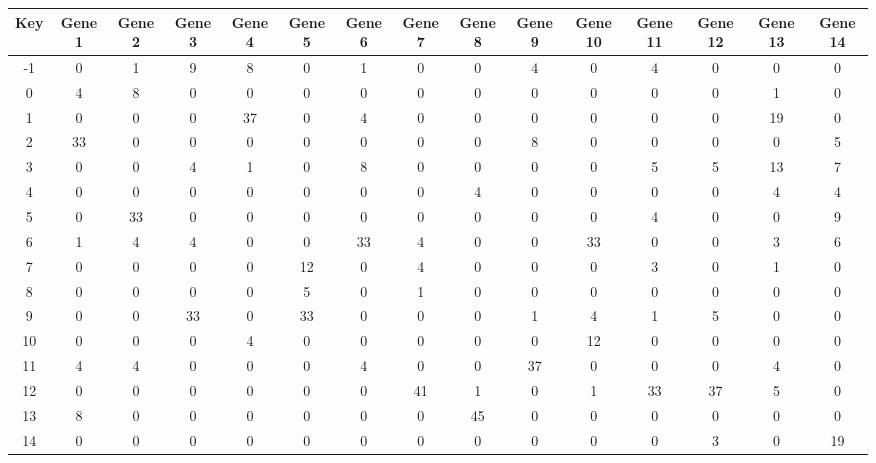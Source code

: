 \begin{tabular}{|c|c|c|c|c|c|c|c|c|c|c|c|c|c|c|}
\hline
Key & Gene 1 & Gene 2 & Gene 3 & Gene 4 & Gene 5 & Gene 6 & Gene 7 & Gene 8 & Gene 9 & Gene 10 & Gene 11 & Gene 12 & Gene 13 & Gene 14 \\
\hline
-1 & 0 & 1 & 9 & 8 & 0 & 1 & 0 & 0 & 4 & 0 & 4 & 0 & 0 & 0 \\
0 & 4 & 8 & 0 & 0 & 0 & 0 & 0 & 0 & 0 & 0 & 0 & 0 & 1 & 0 \\
1 & 0 & 0 & 0 & 37 & 0 & 4 & 0 & 0 & 0 & 0 & 0 & 0 & 19 & 0 \\
2 & 33 & 0 & 0 & 0 & 0 & 0 & 0 & 0 & 8 & 0 & 0 & 0 & 0 & 5 \\
3 & 0 & 0 & 4 & 1 & 0 & 8 & 0 & 0 & 0 & 0 & 5 & 5 & 13 & 7 \\
4 & 0 & 0 & 0 & 0 & 0 & 0 & 0 & 4 & 0 & 0 & 0 & 0 & 4 & 4 \\
5 & 0 & 33 & 0 & 0 & 0 & 0 & 0 & 0 & 0 & 0 & 4 & 0 & 0 & 9 \\
6 & 1 & 4 & 4 & 0 & 0 & 33 & 4 & 0 & 0 & 33 & 0 & 0 & 3 & 6 \\
7 & 0 & 0 & 0 & 0 & 12 & 0 & 4 & 0 & 0 & 0 & 3 & 0 & 1 & 0 \\
8 & 0 & 0 & 0 & 0 & 5 & 0 & 1 & 0 & 0 & 0 & 0 & 0 & 0 & 0 \\
9 & 0 & 0 & 33 & 0 & 33 & 0 & 0 & 0 & 1 & 4 & 1 & 5 & 0 & 0 \\
10 & 0 & 0 & 0 & 4 & 0 & 0 & 0 & 0 & 0 & 12 & 0 & 0 & 0 & 0 \\
11 & 4 & 4 & 0 & 0 & 0 & 4 & 0 & 0 & 37 & 0 & 0 & 0 & 4 & 0 \\
12 & 0 & 0 & 0 & 0 & 0 & 0 & 41 & 1 & 0 & 1 & 33 & 37 & 5 & 0 \\
13 & 8 & 0 & 0 & 0 & 0 & 0 & 0 & 45 & 0 & 0 & 0 & 0 & 0 & 0 \\
14 & 0 & 0 & 0 & 0 & 0 & 0 & 0 & 0 & 0 & 0 & 0 & 3 & 0 & 19 \\
\hline
\end{tabular}
